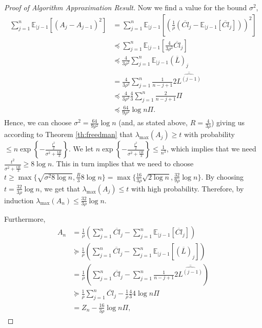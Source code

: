 \documentclass[11pt]{article}
\newcommand{\CExp}[1]{\mathbb{E}_{|#1}}
\begin{document}
\begin{proof}[Proof of Algorithm Approximation Result]
Now we find a value for the bound $ \sigma^{2} $,
\begin{align*}
\sum_{j=1}^{n}\CExp{j-1}\left[\left(A_{j}-A_{j-1}\right)^2\right] &= \sum_{j=1}^{n}\CExp{j-1}\left[\left(\frac{1}{\rho}\left(\overline{Cl}_{j} - \CExp{j-1}\left[\overline{Cl}_{j}\right]\right)\right)^2\right] \\
&\preccurlyeq \sum_{j=1}^{n}\CExp{j-1}\left[\frac{4}{3\rho^{2}}\overline{Cl}_{j}\right] \\
&\preccurlyeq \frac{4}{3\rho^{2}}\sum_{j=1}^{n}\CExp{j-1}\left(\overline{L}\right)_{j} \\
&= \frac{4}{3\rho^{2}}\sum_{j=1}^{n}\frac{1}{n-j+1}2\overline{\widehat{L^{(j-1)}}} \\
&\preccurlyeq \frac{4}{3\rho^{2}} \frac{4}{3} \sum_{j=1}^{n}\frac{2}{n-j+1}\Pi \\
&\preccurlyeq \frac{64}{9\rho^{2}}\log{n} \Pi.
\end{align*}
Hence, we can choose $ \sigma^{2} = \frac{64}{9\rho^{2}}\log{n} $ (and, as stated above, $ R = \frac{4}{3\rho} $) giving us according to Theorem \ref{th:freedman} that $ \lambda_{\text{max}}(A_{j}) \geq t $ with probability $ \leq n\exp\left\{-\frac{\frac{t^{2}}{2}}{\sigma^{2} + \frac{tR}{3}}\right\} $. We let $ n\exp\left\{-\frac{\frac{t^{2}}{2}}{\sigma^{2} + \frac{tR}{3}}\right\} \leq \frac{1}{n^{3}}$, which implies that we need $ \frac{t^{2}}{\sigma^{2} + \frac{tR}{3}} \geq 8\log{n} $. This in turn implies that we need to choose $ t \geq  \max\{\sqrt{\sigma^{2}8\log{n}}, \frac{R}{3}8\log{n}\} = \max\{\frac{16}{3\rho}\sqrt{2\log{n}},\frac{32}{9\rho}\log{n}\}$. By choosing $ t = \frac{32}{3\rho}\log{n} $, we get that $ \lambda_{\text{max}}(A_{j}) \leq t $ with high probability. Therefore, by induction $ \lambda_{\text{max}}(A_{n}) \leq \frac{32}{3\rho}\log{n} $.

Furthermore,
\begin{align*}
A_{n} &= \frac{1}{\rho}\left(\sum_{j=1}^{n}\overline{Cl}_{j} - \sum_{j=1}^{n}\CExp{j-1}\left[\overline{Cl}_{j}\right]\right) \\
&\succcurlyeq \frac{1}{\rho}\left(\sum_{j=1}^{n}\overline{Cl}_{j} - \sum_{j=1}^{n}\CExp{j-1}\left[\left(\overline{L}\right)_{j}\right]\right) \\
&= \frac{1}{\rho}\left(\sum_{j=1}^{n}\overline{Cl}_{j} - \sum_{j=1}^{n}\frac{1}{n-j+1}2\overline{\widehat{L^{(j-1)}}}\right) \\
&\succcurlyeq \frac{1}{\rho}\sum_{j=1}^{n}\overline{Cl}_{j} - \frac{1}{\rho}\frac{4}{3}4\log{n}\Pi \\
&= Z_{n} - \frac{16}{3\rho}\log{n}\Pi,
\end{align*}


\end{proof}
\end{document}
